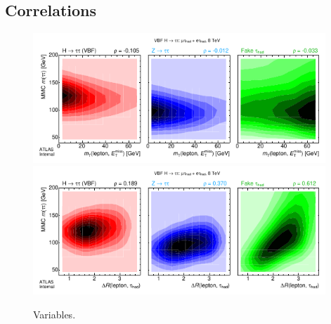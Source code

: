

\subsection{Correlations}
\label{sec:strategy-mva-correlations}

\clearpage

\begin{figure}[tp]
  \centering
  \includegraphics[width=0.98\textwidth]{figures/kinematiccorrelations/mT-vs-mMMC}
  \includegraphics[width=0.98\textwidth]{figures/kinematiccorrelations/taulep_dR-vs-mMMC}
  \caption{Variables.}
  \label{fig:strategy-kinematic-correlations-1}
\end{figure}

